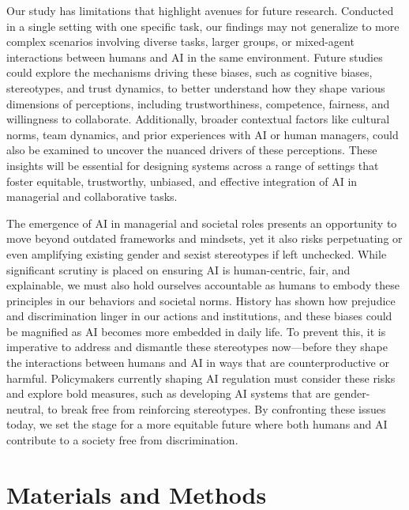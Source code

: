 \documentclass{article}
\begin{document}
Our study has limitations that highlight avenues for future research. Conducted in a single setting with one specific task, our findings may not generalize to more complex scenarios involving diverse tasks, larger groups, or mixed-agent interactions between humans and AI in the same environment. Future studies could explore the mechanisms driving these biases, such as cognitive biases, stereotypes, and trust dynamics, to better understand how they shape various dimensions of perceptions, including trustworthiness, competence, fairness, and willingness to collaborate. Additionally, broader contextual factors like cultural norms, team dynamics, and prior experiences with AI or human managers, could also be examined to uncover the nuanced drivers of these perceptions. These insights will be essential for designing systems across a range of settings that foster equitable, trustworthy, unbiased, and effective integration of AI in managerial and collaborative tasks.

The emergence of AI in managerial and societal roles presents an opportunity to move beyond outdated frameworks and mindsets, yet it also risks perpetuating or even amplifying existing gender and sexist stereotypes if left unchecked. While significant scrutiny is placed on ensuring AI is human-centric, fair, and explainable, we must also hold ourselves accountable as humans to embody these principles in our behaviors and societal norms. History has shown how prejudice and discrimination linger in our actions and institutions, and these biases could be magnified as AI becomes more embedded in daily life. To prevent this, it is imperative to address and dismantle these stereotypes now—before they shape the interactions between humans and AI in ways that are counterproductive or harmful. Policymakers currently shaping AI regulation must consider these risks and explore bold measures, such as developing AI systems that are gender-neutral, to break free from reinforcing stereotypes. By confronting these issues today, we set the stage for a more equitable future where both humans and AI contribute to a society free from discrimination.


\section*{Materials and Methods}
\end{document}
